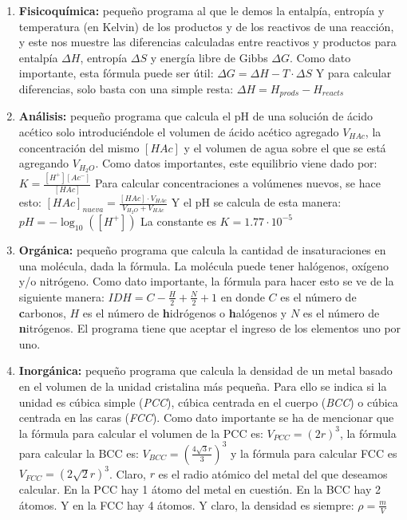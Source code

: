 \documentclass[10pt,letterpaper]{article}
\begin{document}
\begin{enumerate}
\item \textbf{Fisicoqu\'imica:} peque\~no programa al que le demos la entalp\'ia, entrop\'ia y temperatura (en Kelvin) de los productos y de los reactivos de una reacci\'on, y este nos muestre las diferencias calculadas entre reactivos y productos para entalp\'ia $\Delta H$, entrop\'ia $\Delta S$ y energ\'ia libre de Gibbs $\Delta G$. Como dato importante, esta f\'ormula puede ser \'util: $\Delta G = \Delta H - T \cdot \Delta S$ Y para calcular diferencias, solo basta con una simple resta: $\Delta H = H_{prods} - H_{reacts}$
\item \textbf{An\'alisis:} peque\~no programa que calcula el pH de una soluci\'on de \'acido ac\'etico solo introduci\'endole el volumen de \'acido ac\'etico agregado $V_{HAc}$, la concentraci\'on del mismo $\left[ HAc \right]$ y el volumen de agua sobre el que se est\'a agregando $V_{H_2 O}$. Como datos importantes, este equilibrio viene dado por: $K = \frac{\left[ H^+ \right] \left[ Ac^- \right]}{\left[ HAc \right]}$ Para calcular concentraciones a vol\'umenes nuevos, se hace esto: $\left[ HAc \right]_{nueva} = \frac{\left[ HAc \right] \cdot V_{HAc}}{V_{H_2 O} + V_{HAc}}$ Y el pH se calcula de esta manera: $pH = - \log_{10} \left( \left[ H^+ \right] \right)$ La constante es $K = 1.77 \cdot 10^{-5}$
\item \textbf{Org\'anica:} peque\~no programa que calcula la cantidad de insaturaciones en una mol\'ecula, dada la f\'ormula. La mol\'ecula puede tener hal\'ogenos, ox\'igeno y/o nitr\'ogeno. Como dato importante, la f\'ormula para hacer esto se ve de la siguiente manera: $IDH = C - \frac{H}{2} + \frac{N}{2} + 1$ en donde $C$ es el n\'umero de \textbf{c}arbonos, $H$ es el n\'umero de \textbf{h}idr\'ogenos o \textbf{h}al\'ogenos y $N$ es el n\'umero de \textbf{n}itr\'ogenos. El programa tiene que aceptar el ingreso de los elementos uno por uno.
\item \textbf{Inorg\'anica:} peque\~no programa que calcula la densidad de un metal basado en el volumen de la unidad cristalina m\'as peque\~na. Para ello se indica si la unidad es c\'ubica simple (\emph{PCC}), c\'ubica centrada en el cuerpo (\emph{BCC}) o c\'ubica centrada en las caras (\emph{FCC}). Como dato importante se ha de mencionar que la f\'ormula para calcular el volumen de la PCC es: $V_{PCC} = \left( 2 r \right)^3$, la f\'ormula para calcular la BCC es: $V_{BCC} = \left( \frac{4 \sqrt{3} r}{3} \right)^3$ y la f\'ormula para calcular FCC es $V_{FCC} = \left( 2 \sqrt{2} r \right)^3$. Claro, $r$ es el radio at\'omico del metal del que deseamos calcular. En la PCC hay 1 \'atomo del metal en cuesti\'on. En la BCC hay 2 \'atomos. Y en la FCC hay 4 \'atomos. Y claro, la densidad es siempre: $\rho = \frac{m}{V}$
\end{enumerate}
\end{document}
